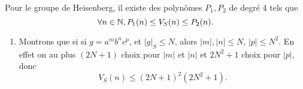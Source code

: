     \begin{prop}
      Pour le groupe de Heisenberg, il existe des polynômes $P_1, P_2$ de degré 4 tels que
        \[\forall n \in \mathbb{N}, P_1(n) \leq V_S(n) \leq P_2(n).\]
    \end{prop}

    \begin{preuve}
      \begin{enumerate}
      \item Montrons que si si $g = a^m b^n c^p$, et $|g|_S \leq N$, alors $|m|, |n| \leq N$, $|p| \leq
        N^2$. En effet on au plus $(2N+1)$ choix pour $|m|$ et $|n|$ et $2N^2 + 1$ choix pour $|p|$, donc
          \[V_S(n) \leq (2N+1)^2(2N^2+1).\]
      \end{enumerate}
    \end{preuve}

    




